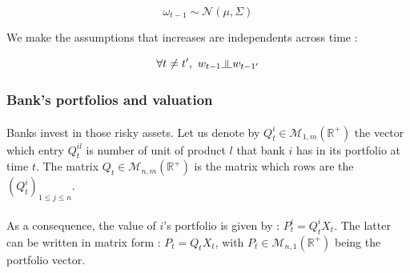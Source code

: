 \documentclass{article}
\newcommand{\indep}{\rotatebox[origin=c]{90}{$\models$}}
\begin{document}
    $$\omega_{t-1} \sim \mathcal{N}(\mu, \Sigma)$$

    
    
We make the assumptions that increases are independents across time :
    
    $$ \forall t \neq t',~ w_{t-1} \indep w_{t-1'} $$
    

    

\subsubsection{Bank's portfolios and valuation}\label{ptfsubsub}

\paragraph{}
Banks invest in those risky assets. Let us denote by $Q_t^i \in \mathcal{M}_{1, m}(\mathbb{R}^+)$ the vector which entry $Q_t^{il}$ is number of unit of product $l$ that bank $i$ has in its portfolio at time $t$. The matrix $Q_t \in \mathcal{M}_{n,m}(\mathbb{R}^+)$ is the matrix which rows are the $(Q_t^i)_{1 \leq j \leq n}$.
    
\paragraph{}
As a consequence, the value of $i$'s portfolio is given by : $P_t^{i} = Q_t^i X_t$. The latter can be written in matrix form : $P_t = Q_t X_t $, with $P_t \in \mathcal{M}_{n, 1}(\mathbb{R}^+)$ being the portfolio vector.
    

\end{document}
